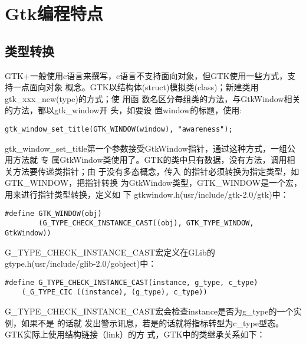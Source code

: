 

\section{Gtk编程特点}

\subsection{类型转换}

GTK+一般使用c语言来撰写，c语言不支持面向对象，但GTK使用一些方式，支持一点面向对象
概念。GTK以结构体(struct)模拟类(class)；新建类用gtk\_xxx\_new(type)的方式；使 用函
数名区分毎组类的方法，与GtkWindow相关的方法，都以gtk\_window开 头，如要设
置window的标题，使用:

\begin{shell}
\begin{verbatim}
gtk_window_set_title(GTK_WINDOW(window), "awareness");
\end{verbatim}
\end{shell}

gtk\_window\_set\_title第一个参数接受GtkWindow指针，通过这种方式，一组公用方法就
专 属GtkWindow类使用了。GTK的类中只有数据，没有方法，调用相关方法要传递类指针；由
于没有多态概念，传入 的指针必须转换为指定类型，如GTK\_WINDOW，把指针转换
为GtkWindow类型，GTK\_WINDOW是一个宏，用来进行指针类型转换，定义如
下 gtkwindow.h(usr/include/gtk-2.0/gtk)中：

\begin{shell}
\begin{verbatim}
#define GTK_WINDOW(obj)                                                       
        (G_TYPE_CHECK_INSTANCE_CAST((obj), GTK_TYPE_WINDOW, GtkWindow))
\end{verbatim}
\end{shell}

G\_TYPE\_CHECK\_INSTANCE\_CAST宏定义在GLib的 gtype.h(usr/include/glib-2.0/gobject)中：

\begin{shell}
\begin{verbatim}
#define G_TYPE_CHECK_INSTANCE_CAST(instance, g_type, c_type)
    (_G_TYPE_CIC ((instance), (g_type), c_type)) 
\end{verbatim}
\end{shell}

G\_TYPE\_CHECK\_INSTANCE\_CAST宏会检查instance是否为g\_type的一个实例，如果不是 的话就
发出警示讯息，若是的话就将指标转型为c\_type型态。GTK实际上使用结构链接（link）的方
式，GTK中的类继承关系如下：

